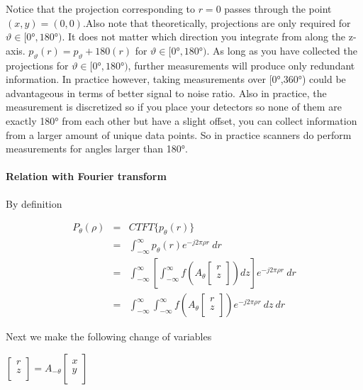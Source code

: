 \documentclass{article}
\begin{document}
Notice that the projection corresponding to $r=0$ passes through the point $(x,y)=(0,0)$.Also note that theoretically, projections are only required for $\vartheta \in [0°, 180°)$. It does not matter which direction you integrate from along the z-axis. $p_\vartheta(r)=p_\vartheta+180(r)$ for $\vartheta \in [0°, 180°)$. As long as you have collected the projections for $\vartheta \in [0°, 180°)$, further measurements will produce only redundant information. In practice however, taking measurements over [0°,360°) could be advantageous in terms of better signal to noise ratio. Also in practice, the measurement is discretized so if you place your detectors so none of them are exactly 180° from each other but have a slight offset, you can collect information from a larger amount of unique data points. So in practice scanners do perform measurements for angles larger than 180°.\citep{projectrheaECE637Tomographic}

\paragraph{Relation with Fourier transform}

By definition


\begin{eqnarray}    \label{eq}
	{P_{\theta}(\rho)}&=&CTFT\{p_{\theta}(r)\}  \nonumber    \\
	~&=&\int_{-\infty}^{\infty}p_{\theta}(r)e^{-j2\pi\rho r}\ dr \nonumber    \\
	~&=&\int_{-\infty}^{\infty}[\int_{-\infty}^{\infty}f(A_{\theta}\begin{bmatrix}
		r \\
		z \\
	\end{bmatrix})dz]e^{-j2\pi\rho r}\ dr \nonumber    \\
	~&=&\int_{-\infty}^{\infty}\int_{-\infty}^{\infty}f(A_{\theta}\begin{bmatrix}
		r \\
		z \\
	\end{bmatrix})e^{-j2\pi\rho r}\ dz\ dr
\end{eqnarray}

Next we make the following change of variables

$\begin{bmatrix}
	r \\
	z \\
\end{bmatrix}=A_{-\theta}\begin{bmatrix}
	x \\
	y \\
\end{bmatrix}$
\end{document}
